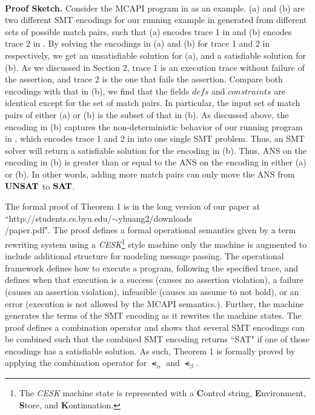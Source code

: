 \\
\textbf{Proof Sketch.}
Consider the MCAPI program in  as an example.
(a) and (b) are two different SMT encodings for our running
example in  generated from different sets of possible match pairs, such that (a) encodes trace 1 in  and (b) encodes trace 2 in . By solving the encodings in (a) and (b) for trace 1 and 2 in  respectively, we get an unsatisfiable solution for (a), and a satisfiable solution for (b). As we discussed in Section 2, trace 1 is an execution trace without failure of the assertion, and trace 2 is the one that fails the assertion. %
Compare both encodings with that in (b), we find that the fields $\mathit{defs}$ and $\mathit{constraints}$ are identical except for the set of match pairs. In particular, the input set of match pairs of either (a) or (b) is the subset of that in (b). As discussed above, the encoding in (b) captures the non-deterministic behavior of our running program in , which encodes trace 1 and 2 in  into one single SMT problem. Thus, an SMT solver will return a satisfiable solution for the encoding in (b). Thus, $\mathrm{ANS}$ on the encoding in (b) is greater than or equal to the $\mathrm{ANS}$ on the encoding in either (a) or (b). In other words, adding more match pairs can only move the $\mathrm{ANS}$ from $\mathrm{\textbf{UNSAT}}$ to $\mathrm{\textbf{SAT}}$.

The formal proof of Theorem 1 is in the long version of our paper at ``http://students.cs.byu.edu/$\sim$yhuang2/downloads\\/paper.pdf". The proof defines a formal operational semantics given by a term rewriting system using a \textit{CESK}\footnote{The \textit{CESK} machine state is represented with a \textbf{C}ontrol string, \textbf{E}nvironment, \textbf{S}tore, and \textbf{K}ontinuation.} style machine only the machine is augmented to include additional structure for modeling message passing. The operational framework defines how to execute a program, following the specified trace, and defines when that execution is a
success (causes no assertion violation), a failure (causes an assertion violation), infeasible (causes an assume to not hold), or an error (execution is not allowed by the MCAPI semantics.). Further, the machine generates the terms of the SMT encoding as it rewrites the machine states. The proof defines a combination operator and shows that several SMT encodings can be combined such that the combined SMT encoding returns ``SAT" if one of those encodings has a satisfiable solution.  As such, Theorem 1 is formally proved by applying the combination operator for $\smt_{\alpha}$ and $\smt_{\beta}$.

